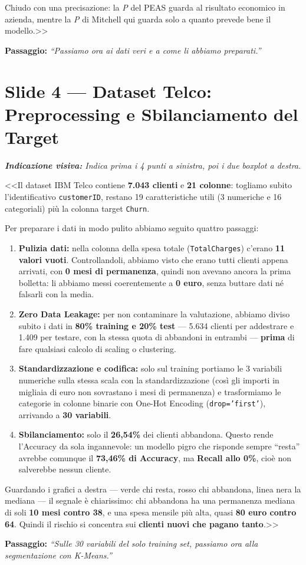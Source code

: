\documentclass[10pt, a4paper]{article}
\newcommand{\cue}[1]{%
  \par\vspace{1pt}\noindent\colorbox{CueBg}{\parbox{\dimexpr\linewidth-2\fboxsep}{\footnotesize\textit{\color{PrimaryNavy}\textbf{Indicazione visiva:} #1}}}\par\vspace{2pt}%
}
\newcommand{\transition}[1]{%
  \par\vspace{1pt}\noindent\colorbox{LightBg}{\parbox{\dimexpr\linewidth-2\fboxsep}{\small\textbf{\color{SecondaryBlue}Passaggio:} \textit{``#1''}}}\par\vspace{2pt}%
}
\begin{document}
Chiudo con una precisazione: la \textit{P} del PEAS guarda al risultato economico in azienda, mentre la \textit{P} di Mitchell qui guarda solo a quanto prevede bene il modello.>>
\transition{Passiamo ora ai dati veri e a come li abbiamo preparati.}

\section*{Slide 4 --- Dataset Telco: Preprocessing e Sbilanciamento del Target}
\cue{Indica prima i 4 punti a sinistra, poi i due boxplot a destra.}
\noindent <<Il dataset IBM Telco contiene \textbf{7.043 clienti} e \textbf{21 colonne}: togliamo subito l'identificativo \texttt{customerID}, restano 19 caratteristiche utili (3 numeriche e 16 categoriali) più la colonna target \texttt{Churn}.

Per preparare i dati in modo pulito abbiamo seguito quattro passaggi:
\begin{enumerate}
    \item \textbf{Pulizia dati:} nella colonna della spesa totale (\texttt{TotalCharges}) c'erano \textbf{11 valori vuoti}. Controllandoli, abbiamo visto che erano tutti clienti appena arrivati, con \textbf{0 mesi di permanenza}, quindi non avevano ancora la prima bolletta: li abbiamo messi coerentemente a \textbf{0 euro}, senza buttare dati né falsarli con la media.
    \item \textbf{Zero Data Leakage:} per non contaminare la valutazione, abbiamo diviso subito i dati in \textbf{80\% training e 20\% test} --- 5.634 clienti per addestrare e 1.409 per testare, con la stessa quota di abbandoni in entrambi --- \textbf{prima} di fare qualsiasi calcolo di scaling o clustering.
    \item \textbf{Standardizzazione e codifica:} solo sul training portiamo le 3 variabili numeriche sulla stessa scala con la standardizzazione (così gli importi in migliaia di euro non sovrastano i mesi di permanenza) e trasformiamo le categorie in colonne binarie con One-Hot Encoding (\texttt{drop='first'}), arrivando a \textbf{30 variabili}.
    \item \textbf{Sbilanciamento:} solo il \textbf{26,54\%} dei clienti abbandona. Questo rende l'Accuracy da sola ingannevole: un modello pigro che risponde sempre ``resta'' avrebbe comunque il \textbf{73,46\% di Accuracy}, ma \textbf{Recall allo 0\%}, cioè non salverebbe nessun cliente.
\end{enumerate}
Guardando i grafici a destra --- verde chi resta, rosso chi abbandona, linea nera la mediana --- il segnale è chiarissimo: chi abbandona ha una permanenza mediana di soli \textbf{10 mesi contro 38}, e una spesa mensile più alta, quasi \textbf{80 euro contro 64}. Quindi il rischio si concentra sui \textbf{clienti nuovi che pagano tanto}.>>
\transition{Sulle 30 variabili del solo training set, passiamo ora alla segmentazione con K-Means.}
\end{document}
